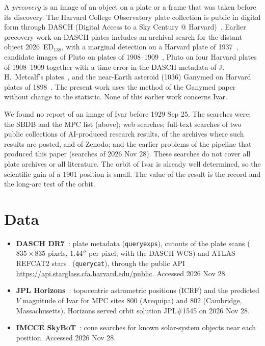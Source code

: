 \documentclass[11pt]{article}
\newcommand{\as}{$''$}
\begin{document}
A \emph{precovery} is an image of an object on a plate or a frame that was taken before its discovery. The Harvard College Observatory plate collection is public in digital form through DASCH (Digital Access to a Sky Century @ Harvard)~\cite{grindlay2012,dasch}. Earlier precovery work on DASCH plates includes an archival search for the distant object 2026~ED$_{138}$, with a marginal detection on a Harvard plate of 1937~\cite{murtagh2026}, candidate images of Pluto on plates of 1908--1909~\cite{graham2026}, Pluto on four Harvard plates of 1908--1909 together with a time error in the DASCH metadata of J.\,H.~Metcalf's plates~\cite{wu2026metcalf}, and the near-Earth asteroid (1036) Ganymed on Harvard plates of 1898~\cite{wu2026ganymed}. The present work uses the method of the Ganymed paper without change to the statistic. None of this earlier work concerns Ivar.

We found no report of an image of Ivar before 1929 Sep 25. The searches were: the SBDB and the MPC list (above); web searches; full-text searches of two public collections of AI-produced research results, of the archives where such results are posted, and of Zenodo; and the earlier problems of the pipeline that produced this paper (searches of 2026 Nov 28). These searches do not cover all plate archives or all literature. The orbit of Ivar is already well determined, so the scientific gain of a 1901 position is small. The value of the result is the record and the long-arc test of the orbit.

\section{Data}
\begin{itemize}
\item \textbf{DASCH DR7}~\cite{dasch}: plate metadata (\texttt{queryexps}), cutouts of the plate scans ($835\times835$ pixels, 1.44\as{} per pixel, with the DASCH WCS) and ATLAS-REFCAT2 stars~\cite{tonry2018} (\texttt{querycat}), through the public API \url{https://api.starglass.cfa.harvard.edu/public}. Accessed 2026 Nov 28.
\item \textbf{JPL Horizons}~\cite{horizons}: topocentric astrometric positions (ICRF) and the predicted $V$ magnitude of Ivar for MPC sites 800 (Arequipa) and 802 (Cambridge, Massachusetts). Horizons served orbit solution JPL\#1545 on 2026 Nov 28.
\item \textbf{IMCCE SkyBoT}~\cite{skybot}: cone searches for known solar-system objects near each position. Accessed 2026 Nov 28.
\end{itemize}
\end{document}
